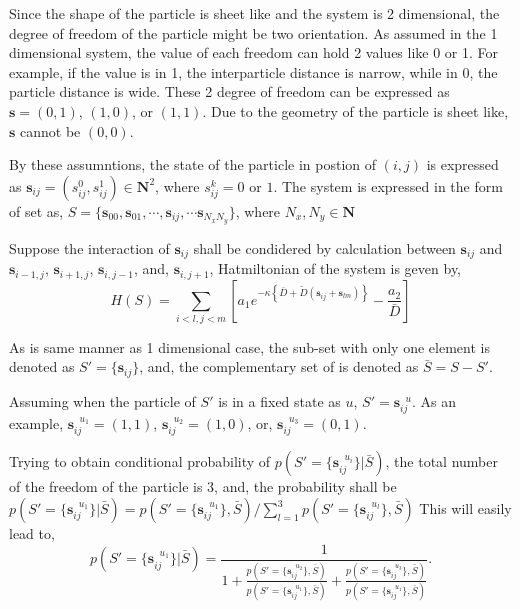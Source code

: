 \documentclass{article}
\begin{document}
Since the shape of the particle is sheet like and the system is 2 dimensional, the degree of freedom of the particle 
might be two orientation. 
As assumed in the 1 dimensional system, the value of each freedom can hold 2 values like 0 or 1.
For example, if the value is in 1, the interparticle distance is narrow, while in 0, the particle distance is wide.
These 2 degree of freedom can be expressed as $\bm{s} = (0, 1)$, $(1, 0)$, or $(1, 1)$.
Due to the geometry of the particle is sheet like, $\bm{s}$ cannot be $(0, 0)$.

By these assumntions, the state of the particle in postion of $(i, j)$ is expressed as $\bm{s}_{ij} = (s^0_{ij}, s^1_{ij}) \in \mathbf{N}^2$, 
where $s^k_{ij} = 0$ or $1$.
The system is expressed in the form of set as, $S = \{\bm{s}_{00}, \bm{s}_{01}, \cdots, \bm{s}_{ij}, \cdots \bm{s}_{N_xN_y}\}$, 
where $N_x, N_y \in \mathbf{N}$

Suppose the interaction of $\bm{s}_{ij}$ shall be condidered by calculation between $\bm{s}_{ij}$ and $\bm{s}_{i-1, j}$, 
$\bm{s}_{i+1, j}$, $\bm{s}_{i, j-1}$, and, $\bm{s}_{i, j+1}$, Hatmiltonian of the system is geven by,
\begin{equation}
 H(S) = \sum_{i<l, j<m} \left[
		a_1 e^{-\kappa \left\{\bar{D} + \tilde{D} \left(\bm{s}_{ij} + \bm{s}_{lm}\right)\right\}}
		- \frac{a_2}{\bar{D}} 
	      \right]
\end{equation}

As is same manner as 1 dimensional case, the sub-set with only one element is denoted as $S' = \{\bm{s}_{ij}\}$, and, 
the complementary set of is denoted as $\bar{S} = S - S'$.

Assuming when the particle of $S'$ is in a fixed state as $u$, $S' = \bm{s}^{\mspace{10mu}u}_{ij}$. As an example, $\bm{s}^{\mspace{10mu}u_1}_{ij} = (1, 1)$,
 $\bm{s}^{\mspace{10mu}u_2}_{ij} = (1, 0)$, or, $\bm{s}^{\mspace{10mu}u_3}_{ij} = (0, 1)$.

Trying to obtain conditional probability of $p(S'=\{\bm{s}^{\mspace{10mu}u_i}_{ij}\}|\bar{S})$, the total number of the freedom of the particle is 3,
and, the probability shall be 
$p(S'=\{\bm{s}^{\mspace{10mu}u_1}_{ij}\}|\bar{S}) = p(S'=\{\bm{s}^{\mspace{10mu}u_1}_{ij}\}, \bar{S})/\sum_{l=1}^3 p(S'=\{\bm{s}^{\mspace{10mu}u_l}_{ij}\}, \bar{S})$
This will easily lead to,
\begin{equation}
 p(S'=\{\bm{s}^{\mspace{10mu}u_1}_{ij}\}|\bar{S}) = 
  \frac{1}{1
  + \frac{p(S'=\{\bm{s}^{\mspace{10mu}u_2}_{ij}\}, \bar{S})}{p(S'=\{\bm{s}^{\mspace{10mu}u_1}_{ij}\}, \bar{S})}
  + \frac{p(S'=\{\bm{s}^{\mspace{10mu}u_3}_{ij}\}, \bar{S})}{p(S'=\{\bm{s}^{\mspace{10mu}u_1}_{ij}\}, \bar{S})}}.
\end{equation}
\end{document}
